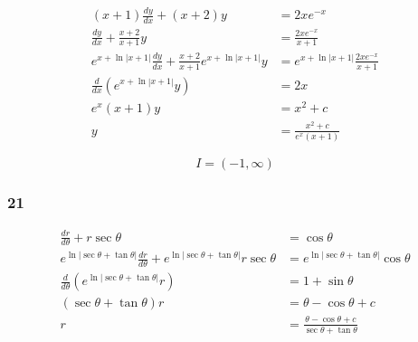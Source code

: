 \documentclass{article}
\begin{document}
\begin{align*}
  (x + 1) \frac{d y}{d x} + (x + 2) y                                             & = 2 x e^{-x}                                   \\
  \frac{d y}{d x} + \frac{x + 2}{x + 1} y                                         & = \frac{2 x e^{-x}}{x + 1}                     \\
  e^{x + \ln |x + 1|} \frac{d y}{d x} + \frac{x + 2}{x + 1} e^{x + \ln |x + 1|} y & = e^{x + \ln |x + 1|} \frac{2 x e^{-x}}{x + 1} \\
  \frac{d}{d x} (e^{x + \ln |x + 1|} y)                                           & = 2 x                                          \\
  e^x (x + 1) y                                                                   & = x^2 + c                                      \\
  y                                                                               & = \frac{x^2 + c}{e^x (x + 1)}
\end{align*}

\[I = (-1, \infty)\]

\subsubsection{21}

\begin{align*}
  \frac{d r}{d \theta} + r \sec \theta                                                                         & = \cos \theta                                                \\
  e^{\ln |\sec \theta + \tan \theta|} \frac{d r}{d \theta} + e^{\ln |\sec \theta + \tan \theta|} r \sec \theta & = e^{\ln |\sec \theta + \tan \theta|} \cos \theta            \\
  \frac{d}{d \theta} (e^{\ln |\sec \theta + \tan \theta|} r)                                                   & = 1 + \sin \theta                                            \\
  (\sec \theta + \tan \theta) r                                                                                & = \theta - \cos \theta + c                                   \\
  r                                                                                                            & = \frac{\theta - \cos \theta + c}{\sec \theta + \tan \theta}
\end{align*}
\end{document}
